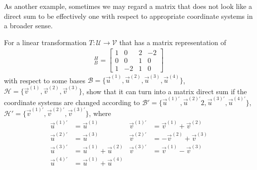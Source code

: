 As another example, sometimes we may regard a matrix that does not look like a direct sum to be effectively one with respect to appropriate coordinate systems in a broader sense.
\begin{exmp}
For a linear transformation $T: \mathcal{U} \to \mathcal{V}$ that has a matrix representation of
\begin{align*}
[T]_B^H =
\begin{bmatrix}
1 & 0 & 2 & -2 \\
0 & 0 & 1 & 0 \\
1 & -2 & 1 & 0
\end{bmatrix} 
\end{align*}
with respect to some bases $\mathcal{B} = \{\vec{u}^{(1)}, \vec{u}^{(2)}, \vec{u}^{(3)}, \vec{u}^{(4)}\}$, $\mathcal{H} = \{\vec{v}^{(1)}, \vec{v}^{(2)}, \vec{v}^{(3)}\}$, show that it can turn into a matrix direct sum if the coordinate systems are changed according to $\mathcal{B}' = \{\vec{u}^{(1)'}, \vec{u}^{(2)'}2, \vec{u}^{(3)'}, \vec{u}^{(4)'}\}$, $\mathcal{H}' = \{\vec{v}^{(1)'}, \vec{v}^{(2)'}, \vec{v}^{(3)'}\}$, where
\begin{align*}
\vec{u}^{(1)'} &= \vec{u}^{(1)} & \vec{v}^{(1)'} &= \vec{v}^{(1)} + \vec{v}^{(2)} \\
\vec{u}^{(2)'} &= \vec{u}^{(3)} & \vec{v}^{(2)'} &= -\vec{v}^{(2)} + \vec{v}^{(3)} \\
\vec{u}^{(3)'} &= \vec{u}^{(1)} + \vec{u}^{(2)} & \vec{v}^{(3)'} &= \vec{v}^{(1)} - \vec{v}^{(3)} \\
\vec{u}^{(4)'} &= \vec{u}^{(1)} + \vec{u}^{(4)}
\end{align*}
\end{exmp}
